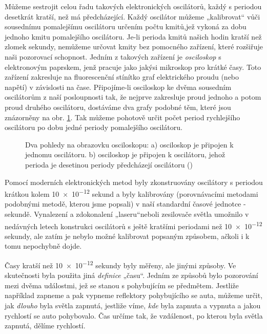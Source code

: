       Můžeme sestrojit celou řadu takových elektronických oscilátorů, každý s periodou desetkrát
      kratší, než má předcházející. Každý oscilátor můžeme „kalibrovat“ vůči sousednímu pomalejšímu
      oscilátoru určením počtu kmitů,jež vykoná za dobu jednoho kmitu pomalejšího oscilátoru. Je-li
      perioda kmitů našich hodin kratší než zlomek sekundy, nemůžeme určovat kmity bez pomocného
      zařízení, které rozšiřuje naši pozorovací schopnost. Jedním z takových zařízení je
      \emph{osciloskop} s elektronovým paprskem, jenž pracuje jako jakýsi mikroskop pro krátké časy.
      Toto zařízení zakresluje na fluorescenční stínítko graf elektrického proudu (nebo napětí) v
      závislosti na čase. Připojíme-li osciloskop ke dvěma sousedním oscilátorům z naší posloupnosti
      tak, že nejprve zakresluje proud jednoho a potom proud druhého oscilátoru, dostáváme dva grafy
      podobné těm, které jsou znázorněny na obr. \ref{fyz:fig065}. Tak můžeme pohotově určit počet
      period rychlejšího oscilátoru po dobu jedné periody pomalejšího oscilátoru. 
      
      \begin{figure}[ht!]  %
        \centering
         \hspace{2em}
         \caption{Dva pohledy
        na obrazovku osciloskopu: a) osciloskop je připojen k jednomu oscilátoru. b) osciloskop je
        připojen k oscilátoru, jehož perioda je desetinou periody předcházejí oscilátoru
        (\cite[s.~66]{Feynman01})}
        \label{fyz:fig065}
      \end{figure}
      
      Pomocí moderních elektronických metod byly zkonstruovány oscilátory s periodou krátkou kolem
      \num{10e-12} sekund a byly kalibrovány (porovnávacími metodami podobnými metodě, kterou jsme
      popsali) v naší standardní časové jednotce - sekundě. Vynalezení a zdokonalení „laseru“neboli
      zesilovače světla umožnilo v nedávných letech konstrukci oscilátorů s ještě kratšími periodami
      než \num{10e-12} sekundy, ale zatím je nebylo možné kalibrovat popsaným způsobem, ačkoli i k
      tomu nepochybně dojde.
      
      Časy kratší než \num{10e-12} sekundy byly měřeny, ale jinými způsoby. Ve skutečnosti byla
      použita jiná \emph{definice} „času“. Jedním ze způsobů bylo pozorování mezi dvěma událostmi,
      jež se stanou s pohybujícím se předmětem. Jestliže například zapneme a pak vypneme reflektory
      pohybujícího se auta, můžeme určit, jak \emph{dlouho} byla světla zapnutá, jestliže víme,
      \emph{kde} byla zapnuta a vypnuta a jakou rychlostí se auto pohybovalo. Čas určíme tak, že
      vzdálenost, po kterou byla světla zapnutá, dělíme rychlostí.
      
